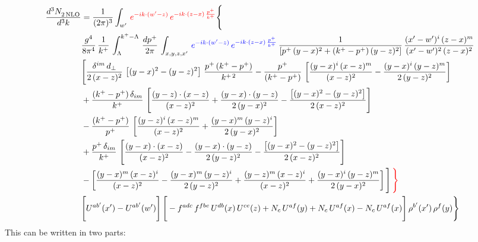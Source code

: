 \documentclass[9pt]{article}
\numberwithin{equation}{section}
\begin{document}
\begin{align}
    \frac{d^{3}N_{2\,\rm NLO}^{\rm}}{d^{3}k}  & =  \frac{1}{(2\pi)^{3}}  \int_{w^\prime}\, {\color{red}e^{-ik\cdot(w'-z)}\,e^{-ik\cdot (z-x)\,\frac{p^{+}}{k^{+}}}} \Bigg\{\notag \\ & \frac{g^{4}}{8\pi^{4}}\,\frac{1}{k^{+}}\,\int_{\Lambda}^{k^{+}-\Lambda}\, \frac{dp^{+}}{2\pi} \, \int_{x,y,z,x'}\,{\color{blue}e^{-ik\cdot(w'-z)}\,e^{-ik\cdot (z-x)\,\frac{p^{+}}{k^{+}}}}\,\frac{1}{\left[p^{+}\,(y-x)^{2}+(k^{+}-p^{+})\,(y-z)^{2}\right]}\, \frac{(x'-w')^{i}\,(z-x)^{m}}{(x'-w')^{2}\,(z-x)^{2}} \notag \\ & \Bigg[\frac{\delta^{im}\,d_{\perp}}{2\,(x-z)^{2}}\,\left[(y-x)^{2}-(y-z)^{2}\right]\,\frac{p^{+}\,(k^{+}-p^{+})}{k^{+\,2}}-\frac{p^{+}}{(k^{+}-p^{+})}\,\left[\frac{(y-x)^{i}\,(x-z)^{m}}{(x-z)^{2}}-\frac{(y-x)^{i}\,(y-z)^{m}}{2\,(y-z)^{2}}\right]\notag \\ & +\frac{(k^{+}-p^{+})\,\delta_{im}}{k^{+}}\,\left[\frac{(y-z)\cdot (x-z)}{(x-z)^{2}}+\frac{(y-x)\cdot (y-z)}{2\,(y-x)^{2}}-\frac{\left[(y-x)^{2}-(y-z)^{2}\right]}{2\,(x-z)^{2}}\right]\notag \\ & -\frac{(k^{+}-p^{+})}{p^{+}}\,\left[\frac{(y-z)^{i}\,(x-z)^{m}}{(x-z)^{2}}+\frac{(y-x)^{m}\,(y-z)^{i}}{2\,(y-x)^{2}}\right]\notag \\ & +\frac{p^{+}\,\delta_{im}}{k^{+}}\,\left[\frac{(y-x)\cdot (x-z)}{(x-z)^{2}}-\frac{(y-x)\cdot (y-z)}{2\,(y-z)^{2}}-\frac{\left[(y-x)^{2}-(y-z)^{2}\right]}{2\,(x-z)^{2}}\right]\notag \\ &-\left[\frac{(y-x)^{m}\,(x-z)^{i}}{(x-z)^{2}}-\frac{(y-x)^{m}\,(y-z)^{i}}{2\,(y-z)^{2}}+\frac{(y-z)^{m}\,(x-z)^{i}}{(x-z)^{2}}+\frac{(y-x)^{i}\,(y-z)^{m}}{2\,(y-x)^{2}}\right]\Bigg]\,{\color{red}\Bigg\}} \notag \\ & \Bigg[U^{ab'}(x')-U^{ab'}(w')\Bigg]\,\Bigg[-f^{adc}\,f^{fbe}\,U^{db}(x)\,U^{ce}(z)+N_{c}\,U^{af}(y)+N_{c}\,U^{af}(x) -N_{c}\,U^{af}(x)\Bigg]\,\rho^{b'}(x')\,\rho^{f}(y)\Bigg\}
\end{align}
This can be written in two parts: 
\end{document}
